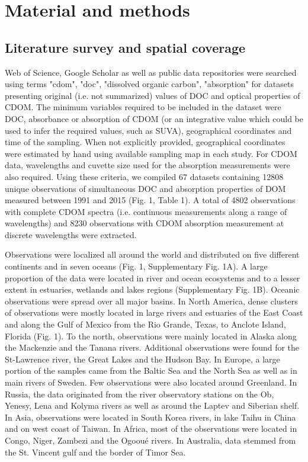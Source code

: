 
\section*{Material and methods}
\label{sec:Material and methods}

\subsection*{Literature survey and spatial coverage}

Web of Science, Google Scholar as well as public data repositories were searched using terms "cdom", "doc", "dissolved organic carbon", "absorption" for datasets presenting original (i.e. not summarized) values of DOC and optical properties of CDOM. The minimum variables required to be included in the dataset were DOC, absorbance or absorption of CDOM (or an integrative value which could be used to infer the required values, such as SUVA), geographical coordinates and time of the sampling. When not explicitly provided, geographical coordinates were estimated by hand using available sampling map in each study. For CDOM data, wavelengths and cuvette size used for the absorption measurements were also required. Using these criteria, we compiled 67 datasets containing 12808 unique observations of simultaneous DOC and absorption properties of DOM measured between 1991 and 2015 (Fig. 1, Table 1). A total of 4802 observations with complete CDOM spectra (i.e. continuous measurements along a range of wavelengths) and 8230 observations with CDOM absorption measurement at discrete wavelengths were extracted.

Observations were localized all around the world and distributed on five different continents and in seven oceans (Fig. 1, Supplementary Fig. 1A). A large proportion of the data were located in river and ocean ecosystems and to a lesser extent in estuaries, wetlands and lakes regions (Supplementary Fig. 1B). Oceanic observations were spread over all major basins. In North America, dense clusters of observations were mostly located in large rivers and estuaries of the East Coast and along the Gulf of Mexico from the Rio Grande, Texas, to Anclote Island, Florida (Fig. 1). To the north, observations were mainly located in Alaska along the Mackenzie and the Tanana rivers. Additional observations were found for the St-Lawrence river, the Great Lakes and the Hudson Bay. In Europe, a large portion of the samples came from the Baltic Sea and the North Sea as well as in main rivers of Sweden. Few observations were also located around Greenland. In Russia, the data originated from the river observatory stations on the Ob, Yenesy, Lena and Kolyma rivers as well as around the Laptev and Siberian shelf. In Asia, observations were located in South Korea rivers, in lake Taihu in China and on west coast of Taiwan. In Africa, most of the observations were located in Congo, Niger, Zambezi and the Ogooué rivers. In Australia, data stemmed from the St. Vincent gulf and the border of Timor Sea.

